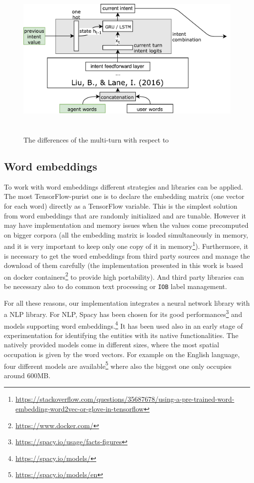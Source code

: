 \begin{figure}[!htb]
    \centering
    \includegraphics[max width=0.9\linewidth,max height=8cm,keepaspectratio]{figures/approachMultiTurnDifferences}
    \caption{The differences of the multi-turn with respect to~\cite{liu2016attention}}\label{fig:approachMultiTurnDifferences}
\end{figure}

\subsection{Word embeddings}
\label{implementationWV}

To work with word embeddings different strategies and libraries can be applied. The most TensorFlow-purist one is to declare the embedding matrix (one vector for each word) directly as a TensorFlow variable. This is the simplest solution from word embeddings that are randomly initialized and are tunable. However it may have implementation and memory issues when the values come precomputed on bigger corpora (all the embedding matrix is loaded simultaneously in memory, and it is very important to keep only one copy of it in memory\footnote{\url{https://stackoverflow.com/questions/35687678/using-a-pre-trained-word-embedding-word2vec-or-glove-in-tensorflow}}). Furthermore, it is necessary to get the word embeddings from third party sources and manage the download of them carefully (the implementation presented in this work is based on docker containers\footnote{\url{https://www.docker.com/}} to provide high portability). And third party libraries can be necessary also to do common text processing or \texttt{IOB} label management.

For all these reasons, our implementation integrates a neural network library with a NLP library. For NLP, Spacy has been chosen for its good performances\footnote{\url{https://spacy.io/usage/facts-figures}} and models supporting word embeddings.\footnote{\url{https://spacy.io/models/}} It has been used also in an early stage of experimentation for identifying the entities with its native functionalities. The natively provided models come in different sizes, where the most spatial occupation is given by the word vectors. For example on the English language, four different models are available\footnote{\url{https://spacy.io/models/en}} where also the biggest one only occupies around 600MB.

